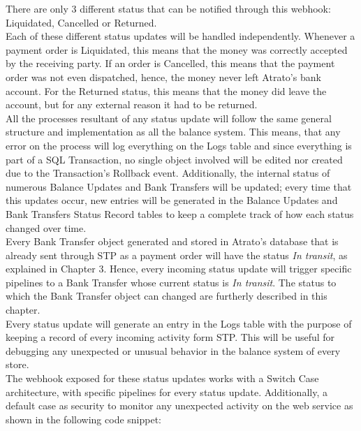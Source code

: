 There are only 3 different status that can be notified through this webhook: Liquidated, Cancelled or Returned.\\

Each of these different status updates will be handled independently. Whenever a payment order is Liquidated, this means that the money was correctly accepted by the receiving party. If an order is Cancelled, this means that the payment order was not even dispatched, hence, the money never left Atrato’s bank account. For the Returned status, this means that the money did leave the account, but for any external reason it had to be returned.\\

All the processes resultant of any status update will follow the same general structure and implementation as all the balance system. This means, that any error on the process will log everything on the Logs table and since everything is part of a SQL Transaction, no single object involved will be edited nor created due to the Transaction’s Rollback event. Additionally, the internal status of numerous Balance Updates and Bank Transfers will be updated; every time that this updates occur, new entries will be generated in the Balance Updates and Bank Transfers Status Record tables to keep a complete track of how each status changed over time.\\

Every Bank Transfer object generated and stored in Atrato’s database that is already sent through STP as a payment order will have the status \textit{In transit}, as explained in Chapter 3. Hence, every incoming status update will trigger specific pipelines to a Bank Transfer whose current status is \textit{In transit}. The status to which the Bank Transfer object can changed are furtherly described in this chapter.\\

Every status update will generate an entry in the Logs table with the purpose of keeping a record of every incoming activity form STP. This will be useful for debugging any unexpected or unusual behavior in the balance system of every store.\\

The webhook exposed for these status updates works with a Switch Case architecture, with specific pipelines for every status update. Additionally, a default case as security to monitor any unexpected activity on the web service as shown in the following code snippet:\\

